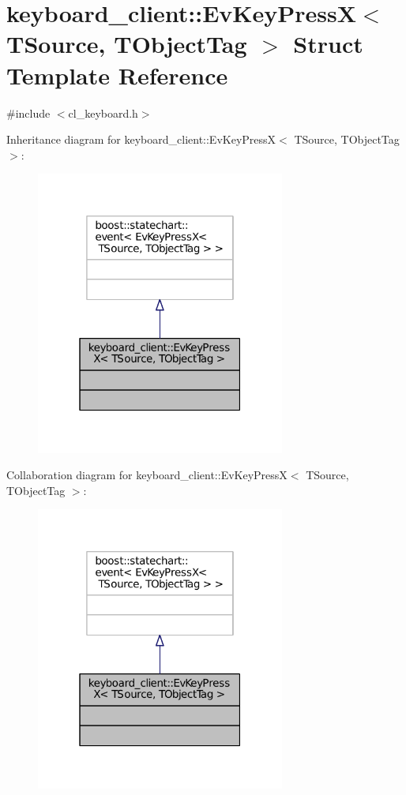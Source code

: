\hypertarget{structkeyboard__client_1_1EvKeyPressX}{}\section{keyboard\+\_\+client\+:\+:Ev\+Key\+PressX$<$ T\+Source, T\+Object\+Tag $>$ Struct Template Reference}
\label{structkeyboard__client_1_1EvKeyPressX}


{\ttfamily \#include $<$cl\+\_\+keyboard.\+h$>$}



Inheritance diagram for keyboard\+\_\+client\+:\+:Ev\+Key\+PressX$<$ T\+Source, T\+Object\+Tag $>$\+:
\nopagebreak
\begin{figure}[H]
\begin{center}
\leavevmode
\includegraphics[width=232pt]{structkeyboard__client_1_1EvKeyPressX__inherit__graph}
\end{center}
\end{figure}


Collaboration diagram for keyboard\+\_\+client\+:\+:Ev\+Key\+PressX$<$ T\+Source, T\+Object\+Tag $>$\+:
\nopagebreak
\begin{figure}[H]
\begin{center}
\leavevmode
\includegraphics[width=232pt]{structkeyboard__client_1_1EvKeyPressX__coll__graph}
\end{center}
\end{figure}


